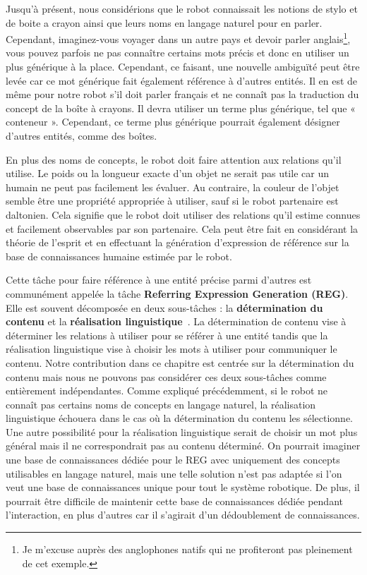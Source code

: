 Jusqu'à présent, nous considérions que le robot connaissait les notions de stylo et de boite a crayon ainsi que leurs noms en langage naturel pour en parler. Cependant, imaginez-vous voyager dans un autre pays et devoir parler anglais\footnote{Je m'excuse auprès des anglophones natifs qui ne profiteront pas pleinement de cet exemple.}, vous pouvez parfois ne pas connaître certains mots précis et donc en utiliser un plus générique à la place. Cependant, ce faisant, une nouvelle ambiguïté peut être levée car ce mot générique fait également référence à d'autres entités. Il en est de même pour notre robot s'il doit parler français et ne connaît pas la traduction du concept de la boîte à crayons. Il devra utiliser un terme plus générique, tel que « conteneur ». Cependant, ce terme plus générique pourrait également désigner d'autres entités, comme des boîtes.

En plus des noms de concepts, le robot doit faire attention aux relations qu'il utilise. Le poids ou la longueur exacte d'un objet ne serait pas utile car un humain ne peut pas facilement les évaluer. Au contraire, la couleur de l'objet semble être une propriété appropriée à utiliser, sauf si le robot partenaire est daltonien. Cela signifie que le robot doit utiliser des relations qu'il estime connues et facilement observables par son partenaire. Cela peut être fait en considérant la théorie de l'esprit et en effectuant la génération d'expression de référence sur la base de connaissances humaine estimée par le robot.

Cette tâche pour faire référence à une entité précise parmi d'autres est communément appelée la tâche \textbf{Referring Expression Generation (REG)}. Elle est souvent décomposée en deux sous-tâches : la \textbf{détermination du contenu} et la \textbf{réalisation linguistique}~\cite{krahmer_2012_computational}. La détermination de contenu vise à déterminer les relations à utiliser pour se référer à une entité tandis que la réalisation linguistique vise à choisir les mots à utiliser pour communiquer le contenu. Notre contribution dans ce chapitre est centrée sur la détermination du contenu mais nous ne pouvons pas considérer ces deux sous-tâches comme entièrement indépendantes. Comme expliqué précédemment, si le robot ne connaît pas certains noms de concepts en langage naturel, la réalisation linguistique échouera dans le cas où la détermination du contenu les sélectionne. Une autre possibilité pour la réalisation linguistique serait de choisir un mot plus général mais il ne correspondrait pas au contenu déterminé. On pourrait imaginer une base de connaissances dédiée pour le REG avec uniquement des concepts utilisables en langage naturel, mais une telle solution n'est pas adaptée si l'on veut une base de connaissances unique pour tout le système robotique. De plus, il pourrait être difficile de maintenir cette base de connaissances dédiée pendant l'interaction, en plus d'autres car il s'agirait d'un dédoublement de connaissances.

